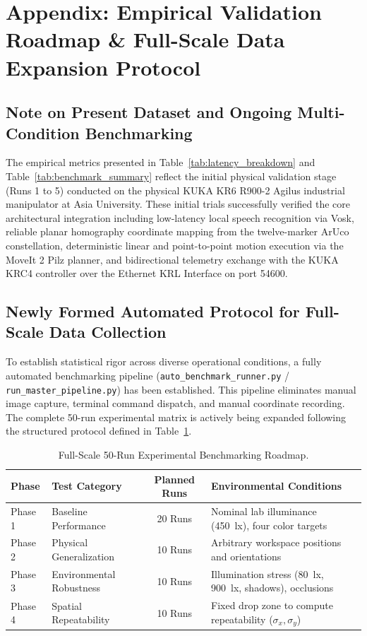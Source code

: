 \documentclass{svproc}
\begin{document}
\section*{Appendix: Empirical Validation Roadmap \& Full-Scale Data Expansion Protocol}

\subsection*{Note on Present Dataset and Ongoing Multi-Condition Benchmarking}
The empirical metrics presented in Table~\ref{tab:latency_breakdown} and Table~\ref{tab:benchmark_summary} reflect the initial physical validation stage (Runs 1 to 5) conducted on the physical KUKA KR6 R900-2 Agilus industrial manipulator at Asia University. These initial trials successfully verified the core architectural integration including low-latency local speech recognition via Vosk, reliable planar homography coordinate mapping from the twelve-marker ArUco constellation, deterministic linear and point-to-point motion execution via the MoveIt 2 Pilz planner, and bidirectional telemetry exchange with the KUKA KRC4 controller over the Ethernet KRL Interface on port 54600.

\subsection*{Newly Formed Automated Protocol for Full-Scale Data Collection}
To establish statistical rigor across diverse operational conditions, a fully automated benchmarking pipeline (\texttt{auto\_benchmark\_runner.py} / \texttt{run\_master_pipeline.py}) has been established. This pipeline eliminates manual image capture, terminal command dispatch, and manual coordinate recording. The complete 50-run experimental matrix is actively being expanded following the structured protocol defined in Table~\ref{tab:protocol_roadmap}.

\begin{table}[h!]
\caption{Full-Scale 50-Run Experimental Benchmarking Roadmap.}
\label{tab:protocol_roadmap}
\centering
\begin{tabular}{llcl}
\hline
\textbf{Phase} & \textbf{Test Category} & \textbf{Planned Runs} & \textbf{Environmental Conditions} \\
\hline
Phase 1 & Baseline Performance & 20 Runs & Nominal lab illuminance (\SI{450}{\lux}), four color targets \\
Phase 2 & Physical Generalization & 10 Runs & Arbitrary workspace positions and orientations \\
Phase 3 & Environmental Robustness & 10 Runs & Illumination stress (\SI{80}{\lux}, \SI{900}{\lux}, shadows), occlusions \\
Phase 4 & Spatial Repeatability & 10 Runs & Fixed drop zone to compute repeatability ($\sigma_x, \sigma_y$) \\
\hline
\end{tabular}
\end{table}
\end{document}
